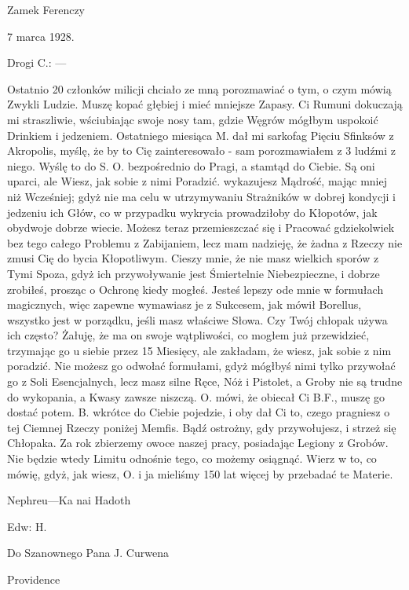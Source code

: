 \begin{displayquote}

\begin{flushright}
Zamek Ferenczy

7 marca 1928.
\end{flushright}

Drogi C.: —

Ostatnio 20 członków milicji chciało ze mną porozmawiać o tym, o czym mówią Zwykli Ludzie. Muszę kopać głębiej i mieć mniejsze Zapasy. Ci Rumuni dokuczają mi straszliwie, wściubiając swoje nosy tam, gdzie Węgrów mógłbym uspokoić Drinkiem i jedzeniem. Ostatniego miesiąca M. dał mi sarkofag Pięciu Sfinksów z Akropolis, myślę, że by to Cię zainteresowało - sam porozmawiałem z 3 ludźmi z niego. Wyślę to do S. O. bezpośrednio do Pragi, a stamtąd do Ciebie. Są oni uparci, ale Wiesz, jak sobie z nimi Poradzić. wykazujesz Mądrość, mając mniej niż Wcześniej; gdyż nie ma celu w utrzymywaniu Strażników w dobrej kondycji i jedzeniu ich Głów, co w przypadku wykrycia prowadziłoby do Kłopotów, jak obydwoje dobrze wiecie. Możesz teraz przemieszczać się i Pracować gdziekolwiek bez tego całego Problemu z Zabijaniem, lecz mam nadzieję, że żadna z Rzeczy nie zmusi Cię do bycia Kłopotliwym. Cieszy mnie, że nie masz wielkich sporów z Tymi Spoza, gdyż ich przywoływanie jest Śmiertelnie Niebezpieczne, i dobrze zrobiłeś, prosząc o Ochronę kiedy mogłeś. Jesteś lepszy ode mnie w formułach magicznych, więc zapewne wymawiasz je z Sukcesem, jak mówił Borellus, wszystko jest w porządku, jeśli masz właściwe Słowa. Czy Twój chłopak używa ich często? Żałuję, że ma on swoje wątpliwości, co mogłem już przewidzieć, trzymając go u siebie przez 15 Miesięcy, ale zakładam, że wiesz, jak sobie z nim poradzić. Nie możesz go odwołać formułami, gdyż mógłbyś nimi tylko przywołać go z Soli Esencjalnych, lecz masz silne Ręce, Nóż i Pistolet, a Groby nie są trudne do wykopania, a Kwasy zawsze niszczą. O. mówi, że obiecał Ci B.F., muszę go dostać potem. B. wkrótce do Ciebie pojedzie, i oby dał Ci to, czego pragniesz o tej Ciemnej Rzeczy poniżej Memfis. Bądź ostrożny, gdy przywołujesz, i strzeż się Chłopaka. Za rok zbierzemy owoce naszej pracy, posiadając Legiony z Grobów. Nie będzie wtedy Limitu odnośnie tego, co możemy osiągnąć. Wierz w to, co mówię, gdyż, jak wiesz, O. i ja mieliśmy 150 lat więcej by przebadać te Materie. 

\begin{flushright}
Nephreu—Ka nai Hadoth

Edw: H.
\end{flushright}

Do Szanownego Pana  J. Curwena

Providence

\end{displayquote}

